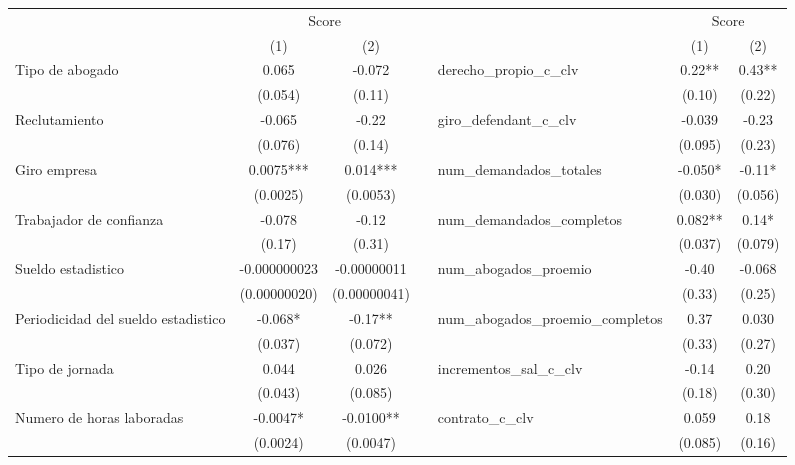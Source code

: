 \begin{tabular}{lccrrcc}
\cmidrule{1-3}\cmidrule{5-7}      & \multicolumn{2}{c}{Score} &       &       & \multicolumn{2}{c}{Score} \\
\cmidrule{1-3}\cmidrule{5-7}      & (1)   & (2)   &       & \multicolumn{1}{l}{} & (1)   & (2) \\
\cmidrule{1-3}\cmidrule{5-7}Tipo de abogado & 0.065 & -0.072 &       & \multicolumn{1}{l}{derecho_propio_c_clv} & 0.22** & 0.43** \\
      & (0.054) & (0.11) &       & \multicolumn{1}{l}{} & (0.10) & (0.22) \\
Reclutamiento & -0.065 & -0.22 &       & \multicolumn{1}{l}{giro_defendant_c_clv} & -0.039 & -0.23 \\
      & (0.076) & (0.14) &       & \multicolumn{1}{l}{} & (0.095) & (0.23) \\
Giro empresa & 0.0075*** & 0.014*** &       & \multicolumn{1}{l}{num_demandados_totales} & -0.050* & -0.11* \\
      & (0.0025) & (0.0053) &       & \multicolumn{1}{l}{} & (0.030) & (0.056) \\
Trabajador de confianza & -0.078 & -0.12 &       & \multicolumn{1}{l}{num_demandados_completos} & 0.082** & 0.14* \\
      & (0.17) & (0.31) &       & \multicolumn{1}{l}{} & (0.037) & (0.079) \\
Sueldo estadistico & -0.000000023 & -0.00000011 &       & \multicolumn{1}{l}{num_abogados_proemio} & -0.40 & -0.068 \\
      & (0.00000020) & (0.00000041) &       & \multicolumn{1}{l}{} & (0.33) & (0.25) \\
Periodicidad del sueldo estadistico & -0.068* & -0.17** &       & \multicolumn{1}{l}{num_abogados_proemio_completos} & 0.37  & 0.030 \\
      & (0.037) & (0.072) &       & \multicolumn{1}{l}{} & (0.33) & (0.27) \\
Tipo de jornada & 0.044 & 0.026 &       & \multicolumn{1}{l}{incrementos_sal_c_clv} & -0.14 & 0.20 \\
      & (0.043) & (0.085) &       & \multicolumn{1}{l}{} & (0.18) & (0.30) \\
Numero de horas laboradas & -0.0047* & -0.0100** &       & \multicolumn{1}{l}{contrato_c_clv} & 0.059 & 0.18 \\
      & (0.0024) & (0.0047) &       & \multicolumn{1}{l}{} & (0.085) & (0.16) \\

\end{tabular}
